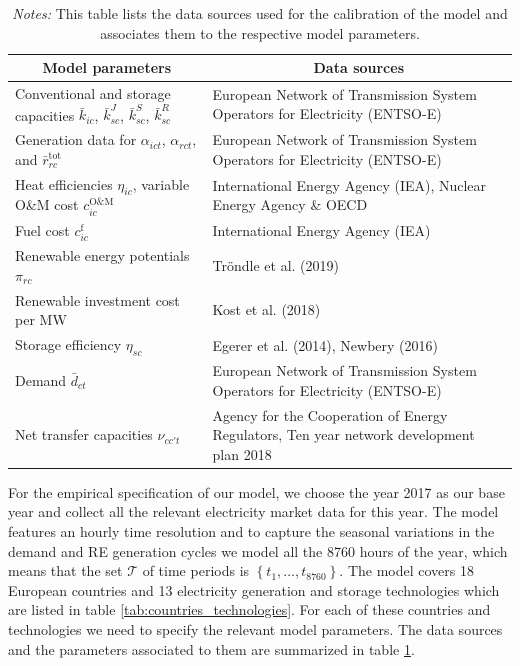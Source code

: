 \documentclass[authoryear]{elsarticle}
\begin{document}
\begin{table}[!htb]\renewcommand{\baselinestretch}{1}\normalsize\footnotesize
	\centering
	\caption{Model specifications: data sources for model parameters }
	\vspace{-1ex}	
	\begin{tabular*}{\textwidth}{@{}@{\extracolsep{\fill}}ll@{}}
		\toprule
		\toprule
		\multicolumn{1}{c}{Model parameters} & \multicolumn{1}{c}{Data sources} \\
		\midrule
		Conventional and storage capacities $\bar{k}_{ic}$, $\bar{k}_{sc}^J$, $\bar{k}_{sc}^S$, $\bar{k}_{sc}^R$ & European Network of Transmission System Operators for Electricity (ENTSO-E) \cite{entsoe-cap} \\
		Generation data for $\alpha_{ict}$, $\alpha_{rct}$, and $\bar{r}^{\mathrm{tot}}_{rc}$ & European Network of Transmission System Operators for Electricity (ENTSO-E) \cite{entsoe-generation} \\
		Heat efficiencies $\eta_{ic}$, variable O\&M cost $c_{ic}^{\mathrm{O\&M}}$ & International Energy Agency (IEA), Nuclear Energy Agency \& OECD \cite{IEA2015} \\
		Fuel cost $c_{ic}^{\mathrm{f}}$ & International Energy Agency (IEA) \cite{IEA2019} \\
		Renewable energy potentials $\pi_{rc}$ & Tröndle et al. (2019)\cite{troendle2019,troendle2019a}\\
		Renewable investment cost per MW & Kost et al. (2018)\cite{ISE2018}\\
		Storage efficiency $\eta_{sc}$ & Egerer et al. (2014)\cite{Egerer2014}, Newbery (2016)\cite{Newbery2016} \\
		Demand $\bar{d}_{ct}$ & European Network of Transmission System Operators for Electricity (ENTSO-E)\cite{entsoe-load} \\   
		Net transfer capacities $\nu_{cc't}$ & Agency for the Cooperation of Energy Regulators\cite{acer2018}, Ten year network development plan 2018\cite{tyndp2018}\\
		\bottomrule
	\end{tabular*}
	\label{tab:data_sources}%
	\vspace{0ex}
	\caption*{\emph{Notes:} This table lists the data sources used for the calibration of the model and associates them to the respective model parameters.}
\end{table}




For the empirical specification of our model, we choose the year 2017 as our base year and collect all the relevant electricity market data for this year. The model features an hourly time resolution and to capture the seasonal variations in the demand and RE generation cycles we model all the 8760 hours of the year, which means that the set $\mathcal{T}$ of time periods is $\left\lbrace t_1, \dots, t_{8760} \right\rbrace$. The model covers 18 European countries and 13 electricity generation and storage technologies which are listed in table \ref{tab:countries_technologies}. For each of these countries and technologies we need to specify the relevant model parameters. The data sources and the parameters associated to them are summarized in table \ref{tab:data_sources}.
\end{document}
